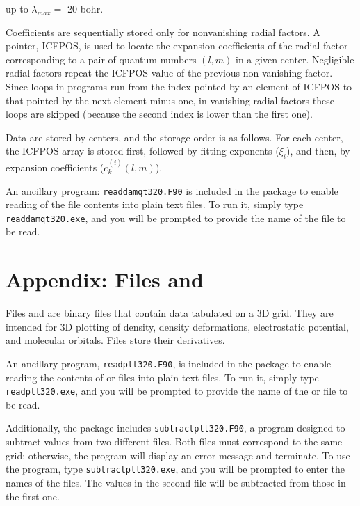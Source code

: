 \documentclass[10pt]{article}
\begin{document}
up to $\lambda_{max} = $ 20 bohr.

Coefficients are sequentially stored only for nonvanishing radial
factors. A pointer, ICFPOS, is used to locate the expansion coefficients of
the radial factor corresponding to a pair of quantum
numbers $(l,m)$ in a given center. Negligible radial factors repeat the ICFPOS 
value of the previous non-vanishing factor. Since loops in programs
run from the index pointed by an element of ICFPOS to that pointed by the next element 
minus one, in vanishing radial factors these loops are skipped (because the second index
is lower than the first one).

Data are stored by centers, and the storage order is as follows. 
For each center, the ICFPOS array is stored first,
followed by fitting exponents ($\xi_i$), and then, by expansion coefficients
($c_k^{(i)}(l,m)$).

An ancillary program: \texttt{readdamqt320.F90} is included in the
package to enable reading of the \damqt{ } file contents into plain text files. 
To run it, simply type \texttt{readdamqt320.exe}, and you will be
prompted to provide the name of the \damqt{ } file to be read.


\section{Appendix: Files \plt{ } and \pltd\label{A3}}

Files \plt{} and \pltd{}
are binary files that contain data
tabulated on a 3D grid. They are intended for 3D plotting of density, density
deformations, electrostatic potential, and molecular orbitals. Files \pltd{ }
store their derivatives.

An ancillary program, \texttt{readplt320.F90}, is included in the package 
to enable reading the contents of \plt{ } or \pltd{ } files into plain text files. 
To run it, simply type \texttt{readplt320.exe}, and you will be prompted 
to provide the name of the \plt{ } or \pltd{ } file to be read.

Additionally, the package includes \texttt{subtractplt320.F90}, a program 
designed to subtract values from two different \plt{ } files. Both \plt{ } 
files must correspond to the same grid; otherwise, the program will 
display an error message and terminate. To use the program, type 
\texttt{subtractplt320.exe}, and you will be prompted to enter the names 
of the \plt{ } files. The values in the second file will be subtracted 
from those in the first one.
\end{document}
